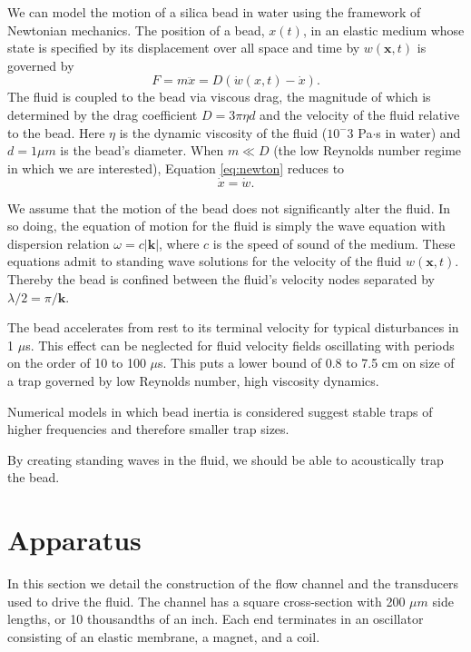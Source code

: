 We can model the motion of a silica bead in water using the framework of Newtonian mechanics.  The position of a bead, $x\left(t\right)$, in an elastic medium whose state is specified by its displacement over all space and time by $w\left(\mathbf{x},t\right)$ is governed by
\begin{equation}
F = m \ddot{x} = D\left(\dot{w}\left(x,t\right)-\dot{x}\right)\label{eq:newton}.
\end{equation}
The fluid is coupled to the bead via viscous drag, the magnitude of which is determined by the drag coefficient $D = 3\pi\eta d$ and the velocity of the fluid relative to the bead.  Here $\eta$ is the dynamic viscosity of the fluid ($10^-3$ Pa$\cdot$s in water) and $d = 1\mu m$ is the bead's diameter.   When $m \ll D$ (the low Reynolds number regime in which we are interested), Equation \ref{eq:newton} reduces to
\begin{equation}
\dot{x} = \dot{w}.
\end{equation}

We assume that the motion of the bead does not significantly alter the fluid.  In so doing, the equation of motion for the fluid is simply the wave equation with dispersion relation $\omega = c \left|\mathbf{k}\right|$, where $c$ is the speed of sound of the medium.  These equations admit to standing wave solutions for the velocity of the fluid $w\left(\mathbf{x},t\right)$. Thereby the bead is confined between the fluid's velocity nodes separated by $\lambda/2 = \pi/\mathbf{k}$.

The bead accelerates from rest to its terminal velocity for typical disturbances in 1 $\mu$s\cite{purcell}.  This effect can be neglected for fluid velocity fields oscillating with periods on the order of 10 to 100 $\mu$s.  This puts a lower bound of 0.8 to 7.5 cm on size of a trap governed by low Reynolds number, high viscosity dynamics.  

Numerical models in which bead inertia is considered suggest stable traps of higher frequencies and therefore smaller trap sizes.

By creating standing waves in the fluid, we should be able to acoustically trap the bead.

\section{Apparatus}
\label{sec:apparatus}

In this section we detail the construction of the flow channel and the transducers used to drive the fluid.  The channel has a square cross-section with 200 $\mu m$ side lengths, or 10 thousandths of an inch.  Each end terminates in an oscillator consisting of an elastic membrane, a magnet, and a coil.

